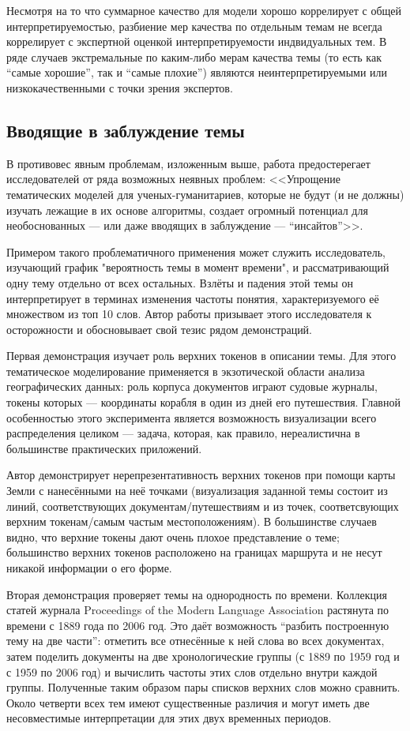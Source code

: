 Несмотря на то что суммарное качество для модели хорошо коррелирует с общей интерпретируемостью, разбиение мер качества по отдельным темам не всегда коррелирует с экспертной оценкой интерпретируемости индвидуальных тем. В ряде случаев экстремальные по каким-либо мерам качества темы (то есть как ``самые хорошие'', так и ``самые плохие'') являются неинтерпретируемыми или низкокачественными с точки зрения экспертов.

\subsection{Вводящие в заблуждение темы}

В противовес явным проблемам, изложенным выше, работа \cite{dh_sea} предостерегает исследователей от ряда возможных неявных проблем: <<Упрощение тематических моделей для ученых-гуманитариев, которые не будут (и не должны) изучать лежащие в их основе алгоритмы, создает огромный потенциал для необоснованных --- или даже вводящих в заблуждение --- ``инсайтов''>>. 

Примером такого проблематичного применения может служить исследователь, изучающий график "вероятность темы в момент времени", и рассматривающий одну тему отдельно от всех остальных. Взлёты и падения этой темы он интерпретирует в терминах изменения частоты понятия, характеризуемого её множеством из топ 10 слов. Автор работы призывает этого исследователя к осторожности и обосновывает свой тезис рядом демонстраций.

Первая демонстрация изучает роль верхних токенов в описании темы. Для этого тематическое моделирование применяется в экзотической области анализа географических данных: роль корпуса документов играют судовые журналы, токены которых --- координаты корабля в один из дней его путешествия. Главной особенностью этого эксперимента является возможность визуализации всего распределения целиком --- задача, которая, как правило, нереалистична в большинстве практических приложений.

Автор демонстрирует нерепрезентативность верхних токенов при помощи карты Земли с нанесёнными на неё точками (визуализация заданной темы состоит из линий, соответствующих документам/путешествиям и из точек, соответсвующих верхним токенам/самым частым местоположениям). В большинстве случаев видно, что верхние токены дают очень плохое представление о теме; большинство верхних токенов расположено на границах маршрута и не несут никакой информации о его форме. 

Вторая демонстрация проверяет темы на однородность по времени. Коллекция статей журнала Proceedings of the Modern Language Association растянута по времени с 1889 года по 2006 год. Это даёт возможность ``разбить построенную тему на две части'': отметить все отнесённые к ней слова во всех документах, затем поделить документы на две хронологические группы (с 1889 по 1959 год и с 1959 по 2006 год) и вычислить частоты этих слов отдельно внутри каждой группы. Полученные таким образом пары списков верхних слов можно сравнить. Около четверти всех тем имеют существенные различия и могут иметь две несовместимые интерпретации для этих двух временных периодов. 

